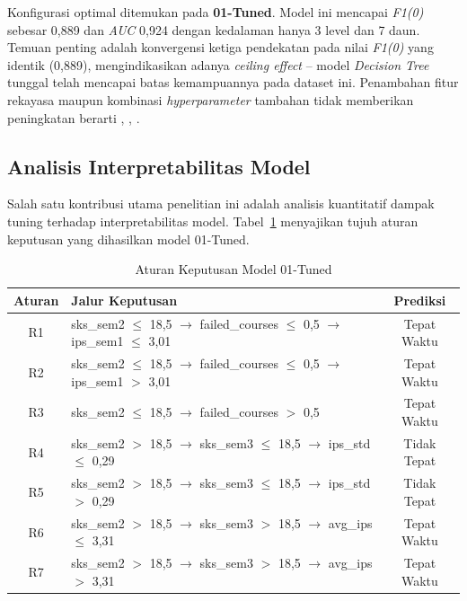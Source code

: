 \documentclass{ieeeaccess}
\begin{document}
Konfigurasi optimal ditemukan pada \textbf{01-Tuned}. Model ini mencapai \emph{F1(0)} sebesar 0,889 dan \emph{AUC} 0,924 dengan kedalaman hanya 3 level dan 7 daun. Temuan penting adalah konvergensi ketiga pendekatan pada nilai \emph{F1(0)} yang identik (0,889), mengindikasikan adanya \emph{ceiling effect} -- model \emph{Decision Tree} tunggal telah mencapai batas kemampuannya pada dataset ini. Penambahan fitur rekayasa maupun kombinasi \emph{hyperparameter} tambahan tidak memberikan peningkatan berarti \cite{ref15}, \cite{ref16}, \cite{ref17}.

\subsection{Analisis Interpretabilitas Model}

Salah satu kontribusi utama penelitian ini adalah analisis kuantitatif dampak tuning terhadap interpretabilitas model. Tabel~\ref{tab:rules} menyajikan tujuh aturan keputusan yang dihasilkan model 01-Tuned.

\begin{table}[t]
\caption{Aturan Keputusan Model 01-Tuned}
\label{tab:rules}
\begin{center}
\small
\begin{tabular}{c|p{50mm}|c}
\hline
\textbf{Aturan} & \textbf{Jalur Keputusan} & \textbf{Prediksi} \\
\hline
R1 & sks\_sem2 $\le$ 18,5 $\rightarrow$ failed\_courses $\le$ 0,5 $\rightarrow$ ips\_sem1 $\le$ 3,01 & Tepat Waktu \\
R2 & sks\_sem2 $\le$ 18,5 $\rightarrow$ failed\_courses $\le$ 0,5 $\rightarrow$ ips\_sem1 $>$ 3,01 & Tepat Waktu \\
R3 & sks\_sem2 $\le$ 18,5 $\rightarrow$ failed\_courses $>$ 0,5 & Tepat Waktu \\
R4 & sks\_sem2 $>$ 18,5 $\rightarrow$ sks\_sem3 $\le$ 18,5 $\rightarrow$ ips\_std $\le$ 0,29 & Tidak Tepat \\
R5 & sks\_sem2 $>$ 18,5 $\rightarrow$ sks\_sem3 $\le$ 18,5 $\rightarrow$ ips\_std $>$ 0,29 & Tidak Tepat \\
R6 & sks\_sem2 $>$ 18,5 $\rightarrow$ sks\_sem3 $>$ 18,5 $\rightarrow$ avg\_ips $\le$ 3,31 & Tepat Waktu \\
R7 & sks\_sem2 $>$ 18,5 $\rightarrow$ sks\_sem3 $>$ 18,5 $\rightarrow$ avg\_ips $>$ 3,31 & Tepat Waktu \\
\hline
\end{tabular}
\end{center}
\end{table}
\end{document}
